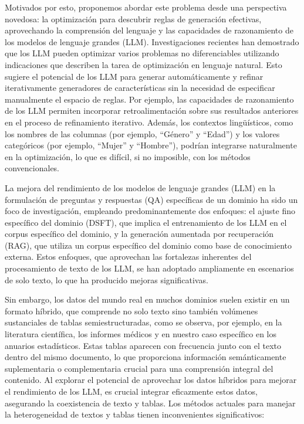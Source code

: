 \documentclass[12pt]{report} %
\begin{document}
Motivados por esto, proponemos abordar este problema desde una perspectiva novedosa: la optimización para descubrir reglas de generación efectivas, aprovechando la comprensión del lenguaje y las capacidades de razonamiento de los modelos de lenguaje grandes (LLM). Investigaciones recientes han demostrado que los LLM pueden optimizar varios problemas no diferenciables utilizando indicaciones que describen la tarea de optimización en lenguaje natural. Esto sugiere el potencial de los LLM para generar automáticamente y refinar iterativamente generadores de características sin la necesidad de especificar manualmente el espacio de reglas. Por ejemplo, las capacidades de razonamiento de los LLM permiten incorporar retroalimentación sobre sus resultados anteriores en el proceso de refinamiento iterativo. Además, los contextos lingüísticos, como los nombres de las columnas (por ejemplo, “Género” y “Edad”) y los valores categóricos (por ejemplo, “Mujer” y “Hombre”), podrían integrarse naturalmente en la optimización, lo que es difícil, si no imposible, con los métodos convencionales.\cite{3}\par
La mejora del rendimiento de los modelos de lenguaje grandes (LLM) en la formulación de preguntas y respuestas (QA) específicas de un dominio ha sido un foco de investigación, empleando predominantemente dos enfoques: el ajuste fino específico del dominio (DSFT), que implica el entrenamiento de los LLM en el corpus específico del dominio, y la generación aumentada por recuperación (RAG), que utiliza un corpus específico del dominio como base de conocimiento externa. Estos enfoques, que aprovechan las fortalezas inherentes del procesamiento de texto de los LLM, se han adoptado ampliamente en escenarios de solo texto, lo que ha producido mejoras significativas.\cite{4}\par
Sin embargo, los datos del mundo real en muchos dominios suelen existir en un formato híbrido, que comprende no solo texto sino también volúmenes sustanciales de tablas semiestructuradas, como se observa, por ejemplo, en la literatura científica, los informes médicos y en nuestro caso específico en los anuarios estadísticos. Estas tablas aparecen con frecuencia junto con el texto dentro del mismo documento, lo que proporciona información semánticamente suplementaria o complementaria crucial para una comprensión integral del contenido. Al explorar el potencial de aprovechar los datos híbridos para mejorar el rendimiento de los LLM, es crucial integrar eficazmente estos datos, asegurando la coexistencia de texto y tablas. Los métodos actuales para manejar la heterogeneidad de textos y tablas tienen inconvenientes significativos:\par
\end{document}
